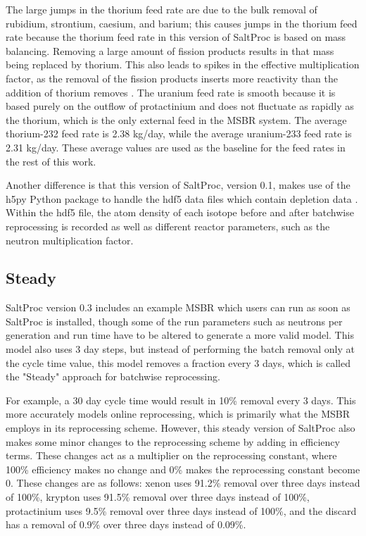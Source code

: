 The large jumps in the thorium feed rate are due to the bulk removal of rubidium, strontium, caesium, and barium; this causes jumps in the thorium feed rate because the thorium feed rate in this version of SaltProc is based on mass balancing.
Removing a large amount of fission products results in that mass being replaced by thorium.
This also leads to spikes in the effective multiplication factor, as the removal of the fission products inserts more reactivity than the addition of thorium removes \cite{rykhlevskii_advanced_2018}. The uranium feed rate is smooth because it is based purely on the outflow of protactinium and does not fluctuate as rapidly as the thorium, which is the only external feed in the MSBR system. The average thorium-232 feed rate is 2.38 kg/day, while the average uranium-233 feed rate is 2.31 kg/day. These average values are used as the baseline for the feed rates in the rest of this work.

Another difference is that this version of SaltProc, version 0.1, makes use of the h5py Python package to handle the hdf5 data files which contain depletion data \cite{collette_python_hdf5_2014}. Within the hdf5 file, the atom density of each isotope before and after batchwise reprocessing is recorded as well as different reactor parameters, such as the neutron multiplication factor.

\subsection{Steady}

SaltProc version 0.3 includes an example MSBR which users can run as soon as SaltProc is installed, though some of the run parameters such as neutrons per generation and run time have to be altered to generate a more valid model. This model also uses 3 day steps, but instead of performing the batch removal only at the cycle time value, this model removes a fraction every 3 days, which is called the "Steady" approach for batchwise reprocessing.

For example, a 30 day cycle time would result in 10\% removal every 3 days. This more accurately models online reprocessing, which is primarily what the MSBR employs in its reprocessing scheme. However, this steady version of SaltProc also makes some minor changes to the reprocessing scheme by adding in efficiency terms. These changes act as a multiplier on the reprocessing constant, where 100\% efficiency makes no change and 0\% makes the reprocessing constant become 0. These changes are as follows: xenon uses 91.2\% removal over three days instead of 100\%, krypton uses 91.5\% removal over three days instead of 100\%, protactinium uses 9.5\% removal over three days instead of 100\%, and the discard has a removal of 0.9\% over three days instead of 0.09\%.

